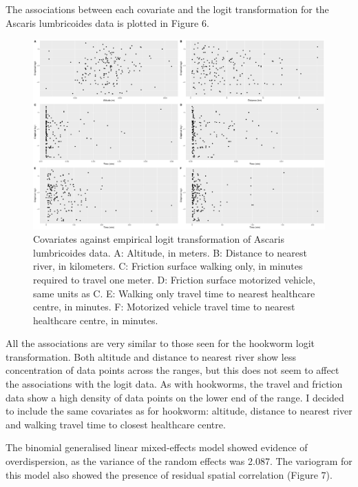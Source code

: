 \documentclass[
]{article}
\begin{document}
The associations between each covariate and the logit transformation for
the Ascaris lumbricoides data is plotted in Figure 6.

\begin{figure}
\centering
\includegraphics{write_up_files/figure-latex/Asc_e.logit-1.pdf}
\caption{Covariates against empirical logit transformation of Ascaris
lumbricoides data. A: Altitude, in meters. B: Distance to nearest river,
in kilometers. C: Friction surface walking only, in minutes required to
travel one meter. D: Friction surface motorized vehicle, same units as
C. E: Walking only travel time to nearest healthcare centre, in minutes.
F: Motorized vehicle travel time to nearest healthcare centre, in
minutes.}
\end{figure}

All the associations are very similar to those seen for the hookworm
logit transformation. Both altitude and distance to nearest river show
less concentration of data points across the ranges, but this does not
seem to affect the associations with the logit data. As with hookworms,
the travel and friction data show a high density of data points on the
lower end of the range. I decided to include the same covariates as for
hookworm: altitude, distance to nearest river and walking travel time to
closest healthcare centre.

The binomial generalised linear mixed-effects model showed evidence of
overdispersion, as the variance of the random effects was 2.087. The
variogram for this model also showed the presence of residual spatial
correlation (Figure 7).
\end{document}
